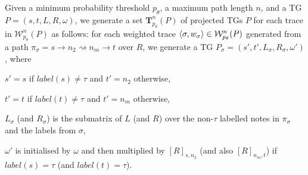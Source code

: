 	\begin{definition}
		Given a minimum probability threshold $p_\theta$, a maximum path length $n$, and a TG $P=(s,t,L,R,\omega)$, we generate a set $\mathbf{T}_{p_\theta}^n(P)$ of projected TGs $P$ for each trace in $\mathcal{W}_{p_\theta}^n(P)$ as follows: for each weighted trace $\braket{\sigma,w_\sigma}\in\mathcal{W}_{p_\theta}^n(P)$ generated from a path $\pi_\sigma=s\to n_2\rightsquigarrow n_m\to t$ over $R$, we generate a TG $P_\sigma=(s',t',L_\sigma,R_\sigma,\omega')$, where \begin{alphalist}
			\item $s'=s$ if $\textit{label}(s)\neq \tau$ and $t'=n_2$ otherwise,
			\item $t'=t$ if $\textit{label}(t)\neq \tau$ and $t'=n_m$ otherwise,
			\item $L_\sigma$ (and $R_\sigma$) is the submatrix of $L$ (and $R$) over the non-$\tau$ labelled notes in $\pi_\sigma$ and the labels from $\sigma$,
			\item $\omega'$ is initialised by $\omega$ and then multiplied by $[R]_{s,n_2}$ (and also $[R]_{n_m,t}$) if $\textit{label}(s)=\tau$ (and  $\textit{label}(t)=\tau$).
		\end{alphalist}
	\end{definition}

